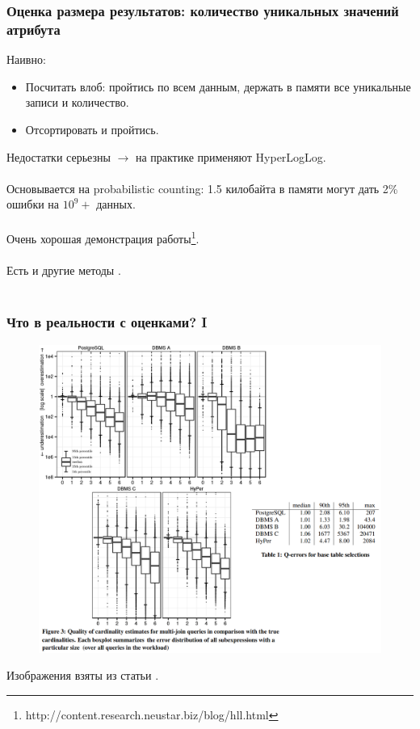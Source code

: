 \documentclass{beamer}
\begin{document}
\begin{frame}
	\frametitle{Оценка размера результатов: количество уникальных значений атрибута}
	Наивно:
	\begin{itemize}
		\item Посчитать влоб: пройтись по всем данным, держать в памяти все уникальные записи и количество.
		\item Отсортировать и пройтись.
	\end{itemize}
	Недостатки серьезны $\longrightarrow$ на практике применяют HyperLogLog.\\~\\
	
	Основывается на probabilistic counting: 1.5 килобайта в памяти могут дать 2\% ошибки на $10^9+$ данных.\\~\\

	Очень хорошая демонстрация работы\footnote{http://content.research.neustar.biz/blog/hll.html}.\\~\\
	
	Есть и другие методы \cite{Harmouch2017}.\\~\\	
	
\end{frame}

\begin{frame}
	\frametitle{Что в реальности с оценками? I}
	


	\begin{figure}[htb]
		\includegraphics[width=\textwidth,height=0.80\textheight,keepaspectratio]{estimates-overall.png} 
	\end{figure}			


	
	Изображения взяты из статьи \cite{Leis2015}.
	
\end{frame}
\end{document}
